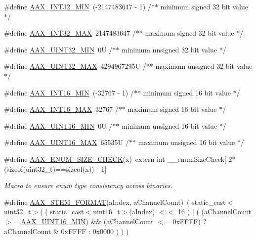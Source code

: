 \begin{DoxyCompactItemize}
\item 
\#define \hyperlink{a00206_ae7543e71654aff007dd5e118f550ade4}{A\+A\+X\+\_\+\+I\+N\+T32\+\_\+\+M\+I\+N}~(-\/2147483647 -\/ 1) /$\ast$$\ast$ minimum signed 32 bit value $\ast$/
\item 
\#define \hyperlink{a00206_a3f56ffc36648f848d952971b79e6058e}{A\+A\+X\+\_\+\+I\+N\+T32\+\_\+\+M\+A\+X}~2147483647      /$\ast$$\ast$ maximum signed 32 bit value $\ast$/
\item 
\#define \hyperlink{a00206_ac15bf852c0f424d26e5d192cd071cea5}{A\+A\+X\+\_\+\+U\+I\+N\+T32\+\_\+\+M\+I\+N}~0\+U              /$\ast$$\ast$ minimum unsigned 32 bit value $\ast$/
\item 
\#define \hyperlink{a00206_a5c6762a806e44dae7db7626d540abdc6}{A\+A\+X\+\_\+\+U\+I\+N\+T32\+\_\+\+M\+A\+X}~4294967295\+U     /$\ast$$\ast$ maximum unsigned 32 bit value $\ast$/
\item 
\#define \hyperlink{a00206_a5fb7a4c8971daed2c77c94f7b380cd3e}{A\+A\+X\+\_\+\+I\+N\+T16\+\_\+\+M\+I\+N}~(-\/32767 -\/ 1)      /$\ast$$\ast$ minimum signed 16 bit value $\ast$/
\item 
\#define \hyperlink{a00206_a2dd148d32d76447c468cf8a46a27f091}{A\+A\+X\+\_\+\+I\+N\+T16\+\_\+\+M\+A\+X}~32767           /$\ast$$\ast$ maximum signed 16 bit value $\ast$/
\item 
\#define \hyperlink{a00206_a8ceb2c21f1d6aa31c5f90b0a03d5d7e6}{A\+A\+X\+\_\+\+U\+I\+N\+T16\+\_\+\+M\+I\+N}~0\+U              /$\ast$$\ast$ minimum unsigned 16 bit value $\ast$/
\item 
\#define \hyperlink{a00206_a3bf68155d417d346f54d7dc96bf6a486}{A\+A\+X\+\_\+\+U\+I\+N\+T16\+\_\+\+M\+A\+X}~65535\+U          /$\ast$$\ast$ maximum unsigned 16 bit value $\ast$/
\item 
\#define \hyperlink{a00206_ad3064f7b1f2c3903562d5475dcb04eec}{A\+A\+X\+\_\+\+E\+N\+U\+M\+\_\+\+S\+I\+Z\+E\+\_\+\+C\+H\+E\+C\+K}(x)~extern int \+\_\+\+\_\+enum\+Size\+Check\mbox{[} 2$\ast$(sizeof(uint32\+\_\+t)==sizeof(x)) -\/ 1\mbox{]}
\begin{DoxyCompactList}\small\item\em Macro to ensure enum type consistency across binaries. \end{DoxyCompactList}\item 
\#define \hyperlink{a00206_a49ce720dc4840f983ca0f3d4d1fd2e9a}{A\+A\+X\+\_\+\+S\+T\+E\+M\+\_\+\+F\+O\+R\+M\+A\+T}(a\+Index,  a\+Channel\+Count)~( static\+\_\+cast$<$uint32\+\_\+t$>$( ( static\+\_\+cast$<$uint16\+\_\+t$>$(a\+Index) $<$$<$ 16 ) $\vert$ ( (a\+Channel\+Count $>$= \hyperlink{a00206_a8ceb2c21f1d6aa31c5f90b0a03d5d7e6}{A\+A\+X\+\_\+\+U\+I\+N\+T16\+\_\+\+M\+I\+N}) \&\& (a\+Channel\+Count $<$= 0x\+F\+F\+F\+F) ? a\+Channel\+Count \& 0x\+F\+F\+F\+F \+: 0x0000 ) ) )
$$
\end{DoxyCompactItemize}

